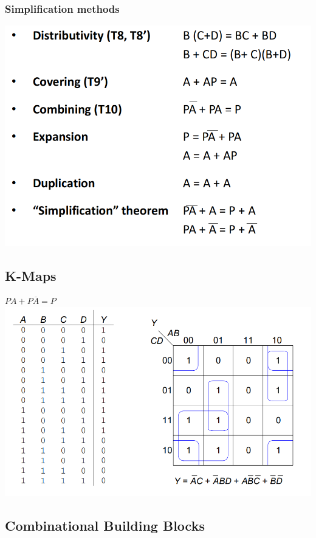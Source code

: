 \documentclass[12pt]{article}
\begin{document}
\subsubsection{Simplification methods}
\includegraphics[width=\textwidth]{Simplification.png}
\subsection{K-Maps}
$PA+P \overline{A}=P$
\newline
\includegraphics[width=\textwidth]{KMAPExample.png}
\subsection{Combinational Building Blocks}
\end{document}
